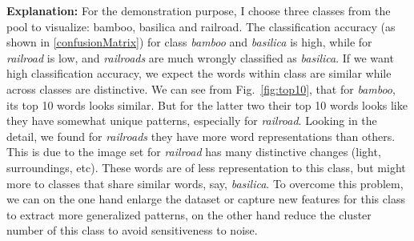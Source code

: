 \documentclass[12pt]{article}
\begin{document}
\noindent\textbf{Explanation:}
For the demonstration purpose, I choose three classes from the pool to visualize: bamboo, basilica and railroad. The classification accuracy (as shown in \ref{confusionMatrix}) for class \emph{bamboo} and \emph{basilica} is high, while for \emph{railroad} is low, and \emph{railroads} are much wrongly classified as \emph{basilica}. If we want high classification accuracy, we expect the words within class are similar while across classes are distinctive. We can see from Fig.~\ref{fig:top10}, that for \emph{bamboo}, its top 10 words looks similar. But for the latter two their top 10 words looks like they have somewhat unique patterns, especially for \emph{railroad}. Looking in the detail, we found for \emph{railroads} they have more word representations than others. This is due to the image set for \emph{railroad} has many distinctive changes (light, surroundings, etc). These words are of less representation to this class, but might more to classes that share similar words, say, \emph{basilica}. To overcome this problem, we can on the one hand enlarge the dataset or capture new features for this class to extract more generalized patterns, on the other hand reduce the cluster number of this class to avoid sensitiveness to noise.
\end{document}

